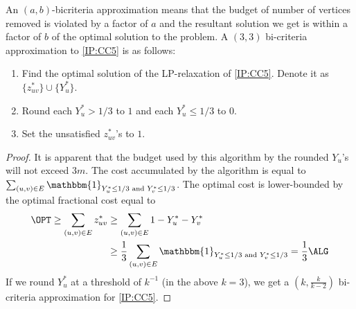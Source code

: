 \begin{algorithm} \label{alg:IP:CC5} An $(a,b)$-bicriteria approximation means that the budget of number of vertices removed is violated by a factor of $a$ and the resultant solution we get is within a factor of $b$ of the optimal solution to the problem. A $(3,3)$ bi-criteria approximation to \ref{IP:CC5} is as follows:
\begin{enumerate}
    \item Find the optimal solution of the LP-relaxation of \ref{IP:CC5}. Denote it as $\{ z_{uv}^* \} \cup \{ Y_u^* \}$.
    \item Round each $Y_u^* > 1/3$ to $1$ and each $Y_u^* \le 1/3$ to $0$.
    \item Set the unsatisfied $z_{uv}^*$'s to $1$.
\end{enumerate}
\end{algorithm}
\begin{proof}
It is apparent that the budget used by this algorithm by the rounded $Y_u$'s will not exceed $3m$. The cost accumulated by the algorithm is equal to $\sum_{(u,v) \in E} \mathbbm{1}_{Y_u^* \le 1/3 \text{ and } Y_v^* \le 1/3}$. The optimal cost is lower-bounded by the optimal fractional cost equal to
\begin{align*}
    \OPT \ge \sum_{(u,v) \in E} z_{uv}^* &\ge \sum_{(u,v) \in E} 1 - Y_u^* - Y_v^* \\
    &\ge \frac{1}{3} \sum_{(u,v) \in E} \mathbbm{1}_{Y_u^* \le 1/3 \text{ and } Y_v^* \le 1/3} = \frac{1}{3} \ALG
\end{align*}
If we round $Y_u^*$ at a threshold of $k^{-1}$ (in the above $k = 3$), we get a $\left(k,\frac{k}{k-2}\right)$ bi-criteria approximation for \ref{IP:CC5}.
\end{proof}


